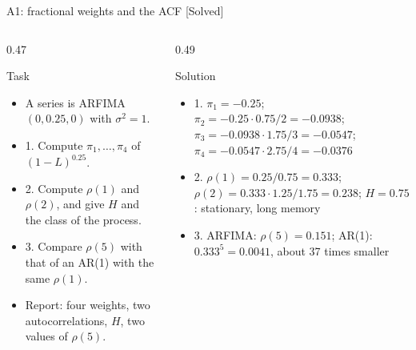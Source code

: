\begin{frame}{A1: fractional weights and the ACF [Solved]}
\itemsize{\scriptsize}
\begin{columns}[T]
\begin{column}{0.47\textwidth}
\begin{block}{Task}
\begin{itemize}
    \item A series is ARFIMA$(0, 0.25, 0)$ with $\sigma^2 = 1$.
    \item 1. Compute $\pi_1, \dots, \pi_4$ of $(1-L)^{0.25}$.
    \item 2. Compute $\rho(1)$ and $\rho(2)$, and give $H$ and the class of the process.
    \item 3. Compare $\rho(5)$ with that of an AR(1) with the same $\rho(1)$.
    \item Report: four weights, two autocorrelations, $H$, two values of $\rho(5)$.
\end{itemize}
\end{block}
\end{column}
\begin{column}{0.49\textwidth}
\begin{exampleblock}{Solution}
\begin{itemize}
    \item 1. $\pi_1 = -0.25$; $\pi_2 = -0.25 \cdot 0.75/2 = -0.0938$; $\pi_3 = -0.0938 \cdot 1.75/3 = -0.0547$; $\pi_4 = -0.0547 \cdot 2.75/4 = -0.0376$
    \item 2. $\rho(1) = 0.25/0.75 = 0.333$; $\rho(2) = 0.333 \cdot 1.25/1.75 = 0.238$; $H = 0.75$: stationary, long memory
    \item 3. ARFIMA: $\rho(5) = 0.151$; AR(1): $0.333^5 = 0.0041$, about 37 times smaller
\end{itemize}
\end{exampleblock}
\end{column}
\end{columns}
\end{frame}

